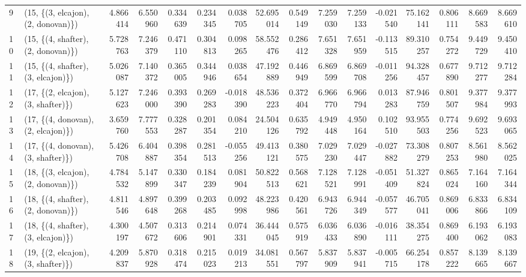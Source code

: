 \begin{tabular}{llrrrrrrrrrrrrrr}
9  &  (15, \{(3, elcajon), (2, donovan)\}) &  4.866414 &  6.550960 &   0.334639 &  0.234345 &  0.038705 &  52.695014 &  0.549149 &   7.259030 &  7.259133 & -0.021540 &   75.162141 &  0.806111 &   8.669583 &   8.669610 \\
10 &  (15, \{(4, shafter), (2, donovan)\}) &  5.728763 &  7.246379 &   0.471110 &  0.304813 &  0.098265 &  58.552476 &  0.286412 &   7.651328 &  7.651959 & -0.113515 &   89.310257 &  0.754272 &   9.449729 &   9.450410 \\
11 &  (15, \{(4, shafter), (3, elcajon)\}) &  5.026087 &  7.140372 &   0.365005 &  0.344946 &  0.038654 &  47.192889 &  0.446949 &   6.869599 &  6.869708 & -0.011256 &   94.328457 &  0.677890 &   9.712277 &   9.712284 \\
12 &  (17, \{(2, elcajon), (3, shafter)\}) &  5.127623 &  7.246000 &   0.393390 &  0.269283 & -0.018390 &  48.536223 &  0.372404 &   6.966770 &  6.966794 &  0.013283 &   87.946759 &  0.801507 &   9.377984 &   9.377993 \\
13 &  (17, \{(4, donovan), (2, elcajon)\}) &  3.659760 &  7.777553 &   0.328287 &  0.201354 &  0.084210 &  24.504126 &  0.635792 &   4.949448 &  4.950164 &  0.102510 &   93.955503 &  0.774256 &   9.692523 &   9.693065 \\
14 &  (17, \{(4, donovan), (3, shafter)\}) &  5.426708 &  6.404887 &   0.398354 &  0.281513 & -0.055256 &  49.413121 &  0.380575 &   7.029230 &  7.029447 & -0.027882 &   73.308279 &  0.807253 &   8.561980 &   8.562025 \\
15 &  (18, \{(3, elcajon), (2, donovan)\}) &  4.784532 &  5.147899 &   0.330347 &  0.184239 &  0.081904 &  50.822513 &  0.568621 &   7.128521 &  7.128991 & -0.051409 &   51.327824 &  0.865024 &   7.164160 &   7.164344 \\
16 &  (18, \{(4, shafter), (2, donovan)\}) &  4.811546 &  4.897648 &   0.399268 &  0.203485 &  0.092998 &  48.223986 &  0.420561 &   6.943726 &  6.944349 & -0.057577 &   46.705041 &  0.869006 &   6.833866 &   6.834109 \\
17 &  (18, \{(4, shafter), (3, elcajon)\}) &  4.300197 &  4.507672 &   0.313606 &  0.214901 &  0.074331 &  36.444045 &  0.575919 &   6.036433 &  6.036890 & -0.016111 &   38.354275 &  0.869400 &   6.193062 &   6.193083 \\
18 &  (19, \{(2, elcajon), (3, shafter)\}) &  4.209837 &  5.870928 &   0.318474 &  0.215023 &  0.019213 &  34.081551 &  0.567797 &   5.837909 &  5.837941 & -0.005715 &   66.254178 &  0.857222 &   8.139665 &   8.139667 \\

\end{tabular}
